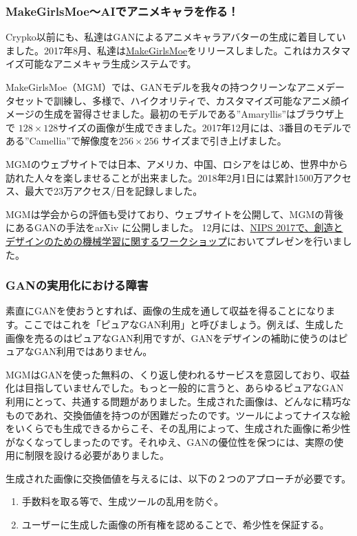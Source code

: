 \documentclass[a4paper]{article}
\begin{document}
\subsubsection{MakeGirlsMoe〜AIでアニメキャラを作る！}
Crypko以前にも、私達はGANによるアニメキャラアバターの生成に着目していました。2017年8月、私達は\href{http://make.girls.moe/#/}{MakeGirlsMoe}をリリースしました。これはカスタマイズ可能なアニメキャラ生成システムです。

MakeGirlsMoe（MGM）では、GANモデルを我々の持つクリーンなアニメデータセットで訓練し、多様で、ハイクオリティで、カスタマイズ可能なアニメ顔イメージの生成を習得させました。最初のモデルである”Amaryllis”はブラウザ上で $128 \times 128$サイズの画像が生成できました。2017年12月には、3番目のモデルである”Camellia”で解像度を$256 \times 256$ サイズまで引き上げました。

MGMのウェブサイトでは日本、アメリカ、中国、ロシアをはじめ、世界中から訪れた人々を楽しませることが出来ました。2018年2月1日には累計1500万アクセス、最大で23万アクセス/日を記録しました。

MGMは学会からの評価も受けており、ウェブサイトを公開して、MGMの背後にあるGANの手法をarXiv\cite{jin2017towards} に公開しました。 12月には、\href{https://nips2017creativity.github.io/}{NIPS 2017で、創造とデザインのための機械学習に関するワークショップ}においてプレゼンを行いました。

\subsubsection{GANの実用化における障害}

素直にGANを使おうとすれば、画像の生成を通して収益を得ることになります。ここではこれを「ピュアなGAN利用」と呼びましょう。例えば、生成した画像を売るのはピュアなGAN利用ですが、GANをデザインの補助に使うのはピュアなGAN利用ではありません。

MGMはGANを使った無料の、くり返し使われるサービスを意図しており、収益化は目指していませんでした。もっと一般的に言うと、あらゆるピュアなGAN利用にとって、共通する問題がありました。生成された画像は、どんなに精巧なものであれ、交換価値を持つのが困難だったのです。ツールによってナイスな絵をいくらでも生成できるからこそ、その乱用によって、生成された画像に希少性がなくなってしまったのです。それゆえ、GANの優位性を保つには、実際の使用に制限を設ける必要がありました。

生成された画像に交換価値を与えるには、以下の２つのアプローチが必要です。

\begin{enumerate}
\item 手数料を取る等で、生成ツールの乱用を防ぐ。
\item ユーザーに生成した画像の所有権を認めることで、希少性を保証する。
\end{enumerate}
\end{document}
